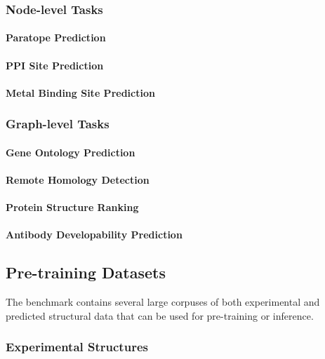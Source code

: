 \subsubsection{Node-level Tasks}
\paragraph{Paratope Prediction}
\paragraph{PPI Site Prediction}
\paragraph{Metal Binding Site Prediction}

\subsubsection{Graph-level Tasks}
\paragraph{Gene Ontology Prediction}
\paragraph{Remote Homology Detection}
\paragraph{Protein Structure Ranking}
\paragraph{Antibody Developability Prediction}








\subsection{Pre-training Datasets}
The benchmark contains several large corpuses of both experimental and predicted structural data that can be used for pre-training or inference.

\subsubsection{Experimental Structures}
